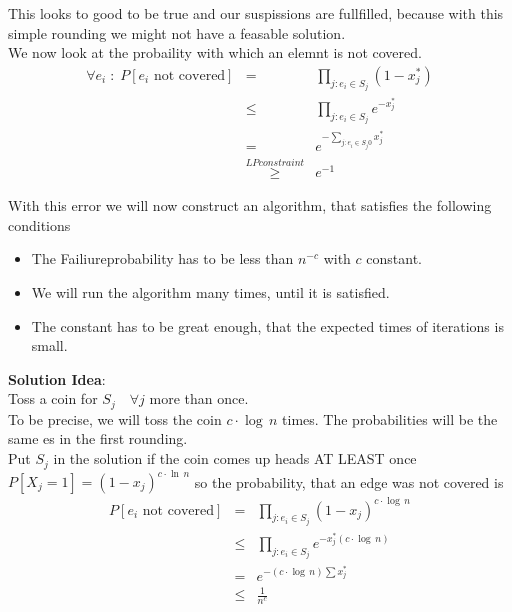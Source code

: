 \documentclass[ngerman,a4paper,11pt]{article}
\begin{document}
This looks to good to be true and our suspissions are fullfilled, because with this simple rounding
we might not have a feasable solution.\\

We now look at the probaility with which an elemnt is not covered.\\

$$\begin{array}{rcl}
\forall e_i \; : \; P[e_i\text{ not covered}] &=& \underset{j:e_i\in S_j}{\prod} (1-x_j^*) \\
&\leq& \underset{j:e_i\in S_j}{\prod} e^{-x_j^*} \\
&=& e^{-\underset{j:e_i\in S_j0}{\sum} x_j^*} \\
&\overset{LP constraint}{\geq}& e^{-1}
\end{array}$$

With this error we will now construct an algorithm, that satisfies the following conditions
\begin{itemize}
   \item The Failiureprobability has to be less than $n^{-c}$ with $c$ constant.
   \item We will run the algorithm many times, until it is satisfied.
   \item The constant has to be great enough, that the expected times of iterations is small.
\end{itemize}

\textbf{Solution Idea}:\\
Toss a coin for $S_j \quad \forall j$ more than once.\\

To be precise, we will toss the coin $c \cdot \log \, n$ times. The probabilities will
be the same es in the first rounding.\\

Put $S_j$ in the solution if the coin comes up heads AT LEAST once\\
$P[X_j=1] = (1-x_j)^{c \cdot \ln \, n}$ so the probability, that an edge was not covered
is
$$\begin{array}{rcl}
P[e_i\text{ not covered}] &=& \underset{j:e_i\in S_j}{\prod} (1-x_j)^{c\cdot \log \, n}\\
&\leq& \underset{j:e_i \in S_j}{\prod} e^{-x_j^*(c\cdot \log \, n)}\\
&=& e^{-(c\cdot \log \, n)\sum x_j^*}\\
&\leq& \frac{1}{n^c}
\end{array}$$
\end{document}

